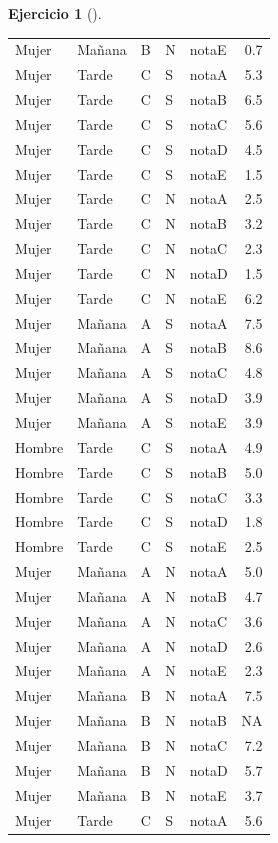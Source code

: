 \documentclass[
  a4paper,
]{scrreport}
\theoremstyle{definition}
\newtheorem{exercise}{Ejercicio}[chapter]
\theoremstyle{remark}
\begin{document}
\begin{exercise}[]
\begin{enumerate}
\begin{tcolorbox}
\begin{longtable}[]{@{}lllllr@{}}
  Mujer & Mañana & B & N & notaE & 0.7 \\
  Mujer & Tarde & C & S & notaA & 5.3 \\
  Mujer & Tarde & C & S & notaB & 6.5 \\
  Mujer & Tarde & C & S & notaC & 5.6 \\
  Mujer & Tarde & C & S & notaD & 4.5 \\
  Mujer & Tarde & C & S & notaE & 1.5 \\
  Mujer & Tarde & C & N & notaA & 2.5 \\
  Mujer & Tarde & C & N & notaB & 3.2 \\
  Mujer & Tarde & C & N & notaC & 2.3 \\
  Mujer & Tarde & C & N & notaD & 1.5 \\
  Mujer & Tarde & C & N & notaE & 6.2 \\
  Mujer & Mañana & A & S & notaA & 7.5 \\
  Mujer & Mañana & A & S & notaB & 8.6 \\
  Mujer & Mañana & A & S & notaC & 4.8 \\
  Mujer & Mañana & A & S & notaD & 3.9 \\
  Mujer & Mañana & A & S & notaE & 3.9 \\
  Hombre & Tarde & C & S & notaA & 4.9 \\
  Hombre & Tarde & C & S & notaB & 5.0 \\
  Hombre & Tarde & C & S & notaC & 3.3 \\
  Hombre & Tarde & C & S & notaD & 1.8 \\
  Hombre & Tarde & C & S & notaE & 2.5 \\
  Mujer & Mañana & A & N & notaA & 5.0 \\
  Mujer & Mañana & A & N & notaB & 4.7 \\
  Mujer & Mañana & A & N & notaC & 3.6 \\
  Mujer & Mañana & A & N & notaD & 2.6 \\
  Mujer & Mañana & A & N & notaE & 2.3 \\
  Mujer & Mañana & B & N & notaA & 7.5 \\
  Mujer & Mañana & B & N & notaB & NA \\
  Mujer & Mañana & B & N & notaC & 7.2 \\
  Mujer & Mañana & B & N & notaD & 5.7 \\
  Mujer & Mañana & B & N & notaE & 3.7 \\
  Mujer & Tarde & C & S & notaA & 5.6 \\

\end{longtable}
\end{tcolorbox}
\end{enumerate}
\end{exercise}
\end{document}
